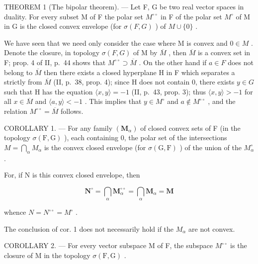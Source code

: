 THEOREM 1 (The bipolar theorem). --- Let F, G be two real vector spaces in duality. For every subset M of F the polar set \(M^{\circ\circ}\) in F of the polar set \(M^{\circ}\) of M in G is the closed convex envelope (for \(\sigma(F, G)\) ) of \(M \cup \{0\}\) .

We have seen that we need only consider the case where M is convex and \(0 \in M\) . Denote the closure, in topology \(\sigma(F, G)\) of M by \(\overline{M}\) , then \(\overline{M}\) is a convex set in F; prop. 4 of II, p.~44 shows that \(M^{\circ\circ} \supset \overline{M}\) . On the other hand if \(a \in F\) does not belong to \(\overline{M}\) then there exists a closed hyperplane H in F which separates a strictly from \(\overline{M}\) (II, p.~38, prop. 4); since H does not contain 0, there exists \(y \in G\) such that H has the equation \(\langle x, y \rangle = -1\) (II, p.~43, prop. 3); thus \(\langle x, y \rangle > -1\) for all \(x \in \overline{M}\) and \(\langle a, y \rangle < -1\) . This implies that \(y \in M^{\circ}\) and \(a \notin M^{\circ\circ}\) , and the relation \(M^{\circ\circ} = \overline{M}\) follows.

COROLLARY 1. --- For any family \((\mathbf{M}_{\alpha})\) of closed convex sets of F (in the topology \(\sigma(\mathrm{F}, \mathrm{G})\) ), each containing 0, the polar set of the intersections \(M = \bigcap_{\alpha} M_{\alpha}\) is the convex closed envelope (for \(\sigma(\mathrm{G}, \mathrm{F})\) ) of the union of the \(M_{\alpha}^{\circ}\) .

For, if N is this convex closed envelope, then

\[
\mathbf {N} ^ {\circ} = \bigcap_ {\alpha} \mathbf {M} _ {\alpha} ^ {\circ \circ} = \bigcap_ {\alpha} \mathbf {M} _ {\alpha} = \mathbf {M}
\]

whence \(N = N^{\circ\circ} = M^{\circ}\) .

The conclusion of cor. 1 does not necessarily hold if the \(M_{\alpha}\) are not convex.

COROLLARY 2. --- For every vector subspace M of F, the subspace \(M^{\circ\circ}\) is the closure of M in the topology \(\sigma(\mathrm{F}, \mathrm{G})\) .

